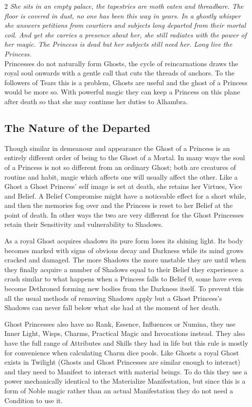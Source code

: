 \begin{multicols}{2}
\textit{She sits in an empty palace, the tapestries are moth eaten and threadbare. The floor is covered in dust, no one has been this way in years. In a ghostly whisper she answers petitions from courtiers and subjects long departed from their mortal coil. And yet she carries a presence about her, she still radiates with the power of her magic. The Princess is dead but her subjects still need her. Long live the Princess. }\\

\noindent Princesses do not naturally form Ghosts, the cycle of reincarnations draws the royal soul onwards with a gentle call that cuts the threads of anchors. To the followers of Tears this is a problem, Ghosts are useful and the ghost of a Princess would be more so. With powerful magic they can keep a Princess on this plane after death so that she may continue her duties to Alhambra.

\subsection*{The Nature of the Departed}

Though similar in demeanour and appearance the Ghost of a Princess is an entirely different order of being to the Ghost of a Mortal. In many ways the soul of a Princess is not so different from an ordinary Ghost; both are creatures of routine and habit, magic which affects one will usually affect the other. Like a Ghost a Ghost Princess' self image is set at death, she retains her Virtues, Vice and Belief. A Belief Compromise might have a noticeable effect for a short while, and then the memories fog over and the Princess is reset to her Belief at the point of death. In other ways the two are very different for the Ghost Princesses retain their Sensitivity and vulnerability to Shadows.

As a royal Ghost acquires shadows its pure form loses its shining light. Its body becomes marked with signs of obvious decay and Darkness while its mind grows cracked and damaged. The more Shadows the more unstable they are until when they finally acquire a number of Shadows equal to their Belief they experience a crash similar to what happens when a Princess falls to Belief 0, some have even become Dethroned forming new bodies from the Darkness itself. To prevent this all the usual methods of removing Shadows apply but a Ghost Princess's Shadows can never fall below what she had at the moment of her death. 

Ghost Princesses also have no Rank, Essence, Influences or Numina, they use Inner Light, Wisps, Charms, Practical Magic and Invocations instead. They also have the full range of Attributes and Skills they had in life but this rule is mostly for convenience when calculating Charm dice pools. Like Ghosts a royal Ghost exists in Twilight (Ghosts and Ghost Princesses are similar enough to interact) and they need to Manifest to interact with material beings. To do this they use a power mechanically identical to the Materialize Manifestation, but since this is a form of Noble magic rather than an actual Manifestation they do not need a Condition to use it. 


\end{multicols}
